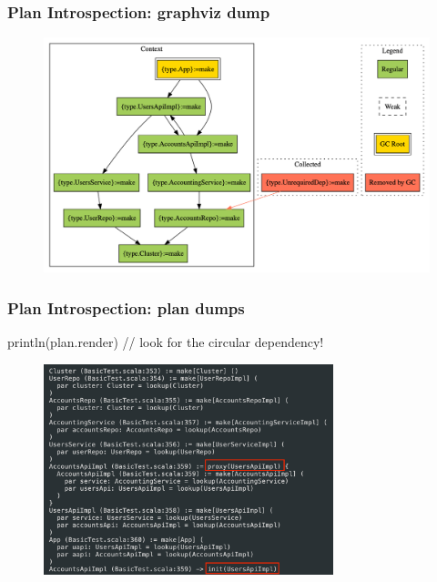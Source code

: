 \documentclass[usenames,dvipsnames]{beamer}
\begin{document}
\begin{frame}
  \frametitle{Plan Introspection: graphviz dump\footnotemark[1]}
  \begin{figure}
    \includegraphics[width=\textwidth]{media/plan-example-dot}
  \end{figure}
\end{frame}

\begin{frame}[fragile]
\frametitle{Plan Introspection: plan dumps}
\begin{scalacode}
println(plan.render) // look for the circular dependency!
\end{scalacode}

\begin{figure}
    \includegraphics[width=0.75\textwidth]{media/plan-example.png}
\end{figure}
\end{frame}
\end{document}
